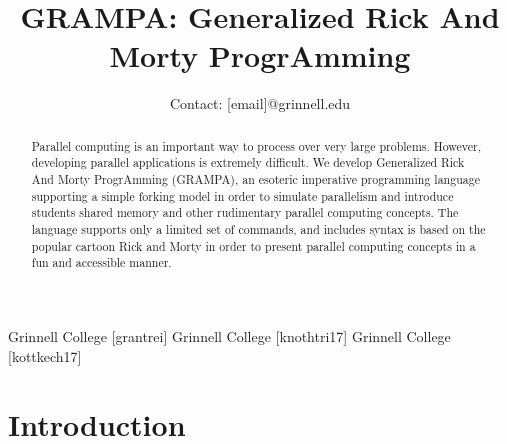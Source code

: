 \documentclass[preprint]{sigplanconf}
\begin{document}
\setlength{\pdfpageheight}{\paperheight}
\setlength{\pdfpagewidth}{\paperwidth}

\allowdisplaybreaks



\title{GRAMPA: Generalized Rick And Morty ProgrAmming}
\subtitle{Contact: [email]@grinnell.edu}

           {Grinnell College}
           {[grantrei]}
           {Grinnell College}
           {[knothtri17]}
           {Grinnell College}
           {[kottkech17]}

\maketitle

\begin{abstract}
Parallel computing is an important way to process over very large problems. However, developing parallel applications is extremely difficult. We develop Generalized Rick And Morty ProgrAmming (GRAMPA), an esoteric imperative programming language supporting a simple forking model in order to simulate parallelism and introduce students shared memory and other rudimentary parallel computing concepts. The language supports only a limited set of commands, and includes syntax is based on the popular cartoon Rick and Morty in order to present parallel computing concepts in a fun and accessible manner.
\end{abstract}

\section{Introduction}
\end{document}
